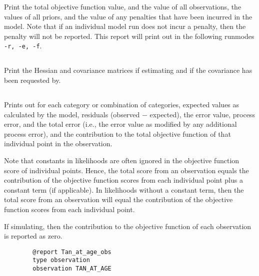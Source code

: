 Print the total objective function value, and the value of all observations, the values of all priors, and the value of any penalties that have been incurred in the model. Note that if an individual model run does not incur a penalty, then the penalty will not be reported. This report will print out in the following runmodes \texttt{-r, -e, -f}.

\subsection{}

Print the Hessian and covariance matrices if estimating and if the covariance has been requested by.

\subsection{}

Prints out for each category or combination of categories, expected values as calculated by the model, residuals (observed $-$ expected), the error value, process error, and the total error (i.e., the error value as modified by any additional process error), and the contribution to the total objective function of that individual point in the observation. 

Note that constants in likelihoods are often ignored in the objective function score of individual points. Hence, the total score from an observation equals the contribution of the objective function scores from each individual point plus a constant term (if applicable). In likelihoods without a constant term, then the total score from an observation will equal the contribution of the objective function scores from each individual point.

If simulating, then the contribution to the objective function of each observation is reported as zero. 

{\small{\begin{verbatim}
		@report Tan_at_age_obs
		type observation
		observation TAN_AT_AGE
		\end{verbatim}}}

\subsection{}

